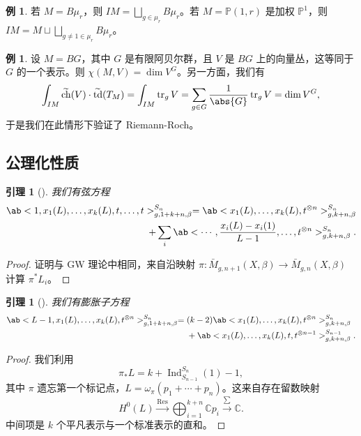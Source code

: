 \documentclass{amsart}
\newtheorem{lem}[thm]{引理}
\theoremstyle{definition}
\newtheorem{exm}[thm]{例}
\theoremstyle{remark}
\theoremstyle{plain}
\theoremstyle{definition}
\theoremstyle{remark}
\newcommand{\C}{\mathbb{C}}
\renewcommand{\P}{\mathbb{P}}
\newcommand{\on}[1]{\operatorname{#1}}
\newcommand{\wt}[1]{\widetilde{#1}}
\newcommand{\1}{\mathbf{1}}
\newcommand{\2}{\mathbf{2}}
\newcommand{\3}{\mathbf{3}}
\begin{document}
\begin{exm}
    若 \(M = B\mu_r\)，则 \(IM = \bigsqcup_{g \in \mu_r} B \mu_r\)。若 \(M = \P(1, r)\) 是加权 \(\P^1\)，则 \(IM = M \sqcup \bigsqcup_{g \neq 1 \in \mu_r} B\mu_r\)。    
\end{exm}

\begin{exm}
    设 \(M = BG\)，其中 \(G\) 是有限阿贝尔群，且 \(V\) 是 \(BG\) 上的向量丛，这等同于 \(G\) 的一个表示。则 \(\chi(M, V) = \dim V^G\)。另一方面，我们有
    \[ \int_{IM} \wt{\on{ch}}(V) \cdot \wt{\on{td}}(T_M) = \int_{IM} \on{tr}_g V = \sum_{g \in G} \frac{1}{\abs{G}} \on{tr}_g V = \dim V^G, \]
    于是我们在此情形下验证了 Riemann-Roch。
\end{exm}

\subsection{公理化性质}%
\label{sub:Axiomatic properties}

\begin{lem}[{\cite{GiventalK7}}]
    我们有\textit{弦方程}
    \begin{align*}
        \ab< 1, x_1(L), \ldots, x_k(L), t, \ldots, t >_{g, 1+k+n, \beta}^{S_n} = \ab<x_1(L), \ldots, x_k(L), t^{\otimes n}>^{S_n}_{g,k+n,\beta} \\
        + \sum_i \ab< \cdots, \frac{x_i(L) - x_i(1)}{L-1}, \ldots, t^{\otimes n}>^{S_n}_{g,k+n,\beta}. 
    \end{align*}
\end{lem}

\begin{proof}
    证明与 GW 理论中相同，来自沿映射 \(\pi \colon\bar{M}_{g,n+1}(X,\beta) \to \bar{M}_{g,n}(X,\beta)\) 计算 \(\pi^* L_i\)。
\end{proof}

\begin{lem}[{\cite{GiventalK7}}]
    我们有\textit{膨胀子方程}
    \begin{align*}
        \ab<L-1, x_1(L), \ldots, x_k(L), t^{\otimes n}>_{g,1+k+n,\beta}^{S_n} ={}& (k-2)\ab<x_1(L), \ldots, x_k(L), t^{\otimes n}>_{g,k+n,\beta}^{S_n} \\
        &+ \ab<x_1(L), \ldots, x_k(L), t, t^{\otimes n-1}>_{g,k+n,\beta}^{S_{n-1}}.
    \end{align*}
\end{lem}

\begin{proof}
    我们利用
    \[ \pi_* L = k + \on{Ind}_{S_{n-1}}^{S_n}(1) - 1, \]
    其中 \(\pi\) 遗忘第一个标记点，\(L = \omega_{\pi} (p_1 + \cdots + p_n)\)。这来自存在留数映射
    \[ H^0(L) \xrightarrow{\on{Res}} \bigoplus_{i=1}^{k+n} \C p_i \xrightarrow{\sum} \C. \]
    中间项是 \(k\) 个平凡表示与一个标准表示的直和。
\end{proof}
\end{document}
